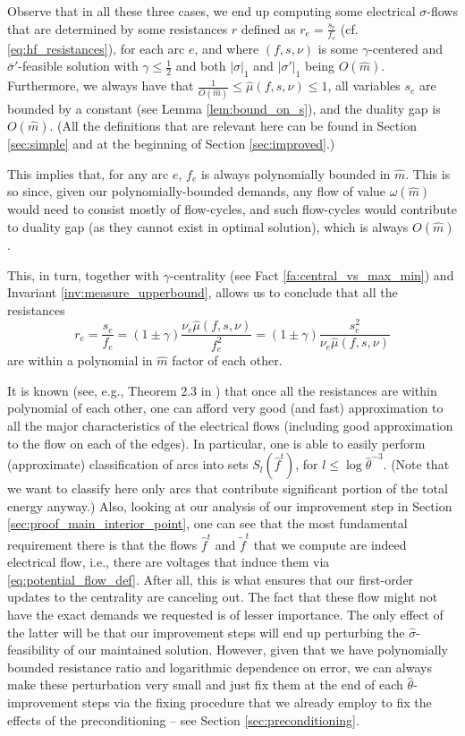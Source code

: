 \documentclass[11pt, letterpaper]{article}
\newcommand{\onorm}[1]{|#1|_{1}}
\newcommand{\hm}{\widehat{m}}
\newcommand{\Cset}[2]{S_{#1}(#2)}
\newcommand{\hmu}{\hat{\mu}}
\newcommand{\htheta}{\hat{\theta}}
\newcommand{\vnu}{\boldsymbol{\mathit{\nu}}}
\newcommand{\vsigma}{\boldsymbol{\mathit{\sigma}}}
\newcommand{\ovsigma}{\boldsymbol{\mathit{\bar{\sigma}}}}
\newcommand{\hvsigma}{\boldsymbol{\mathit{\hat{\sigma}}}}
\newcommand{\ff}{\boldsymbol{\mathit{f}}}
\newcommand{\tff}{\boldsymbol{\mathit{\tilde{f}}}}
\newcommand{\hff}{\boldsymbol{\mathit{\hat{f}}}}
\newcommand{\rr}{\boldsymbol{\mathit{r}}}
\renewcommand{\ss}{\boldsymbol{\mathit{s}}}
\begin{document}
Observe that in all these three cases, we end up computing some electrical $\vsigma$-flows that are determined by some resistances $\rr$ defined as $r_e=\frac{s_e}{f_e}$ (cf. \eqref{eq:hf_resistances}), for each arc $e$, and where $(\ff,\ss,\vnu)$ is some $\gamma$-centered and $\ovsigma'$-feasible solution  with $\gamma\leq \frac{1}{2}$ and both $\onorm{\vsigma}$ and $\onorm{\vsigma'}$ being $O(\hm)$. Furthermore, we always have that $\frac{1}{O(\hm)}\leq \hmu(\ff,\ss,\vnu)\leq 1$, all variables $s_e$ are bounded by a constant (see Lemma \ref{lem:bound_on_s}), and the duality gap is $O(\hm)$. (All the definitions that are relevant here can be found in Section \ref{sec:simple} and at the beginning of Section \ref{sec:improved}.)

This implies that, for any arc $e$, $f_e$ is always polynomially bounded in $\hm$. This is so since, given our polynomially-bounded demands, any flow of value $\omega(\hm)$ would need to consist mostly of flow-cycles, and such flow-cycles would contribute to duality gap (as they cannot exist in optimal solution), which is always $O(\hm)$. 

This, in turn, together with $\gamma$-centrality (see Fact \ref{fa:central_vs_max_min}) and Invariant \ref{inv:measure_upperbound}, allows us to conclude that all the resistances 
\[
r_e=\frac{s_e}{f_e}=(1\pm \gamma)\frac{\nu_e \hmu(\ff,\ss,\vnu)}{f_e^2} = (1\pm \gamma)\frac{s_e^2}{\nu_e \hmu(\ff,\ss,\vnu)}
\]
are within a polynomial in $\hm$ factor of each other. 

It is known (see, e.g., Theorem 2.3 in \cite{ChristianoKMST11}) that once all the resistances are within polynomial of each other, one can afford very good (and fast) approximation to all the major characteristics of the electrical flows (including good approximation to the flow on each of the edges). In particular, one is able to easily perform (approximate) classification of arcs into sets $\Cset{l}{\hff^t}$, for $l\leq \log \htheta^{-3}$. (Note that we want to classify here only arcs that contribute significant portion of the total energy anyway.)  Also, looking at our analysis of our improvement step in Section \ref{sec:proof_main_interior_point}, one can see that the most fundamental requirement there is that the flows $\hff^t$ and $\tff^t$ that we compute are indeed electrical flow, i.e., there are voltages that induce them via \eqref{eq:potential_flow_def}. After all, this is what ensures that our first-order updates to the centrality are canceling out. The fact that these flow might not have the exact demands we requested is of lesser importance. The only effect of the latter will be that our improvement steps will end up perturbing the $\hvsigma$-feasibility of our maintained solution. However, given that we have polynomially bounded resistance ratio and logarithmic dependence on error, we can always make these perturbation very small and just fix them at the end of each $\htheta$-improvement steps via the fixing procedure that we already employ to fix the effects of the preconditioning -- see Section \ref{sec:preconditioning}. 
\end{document}
